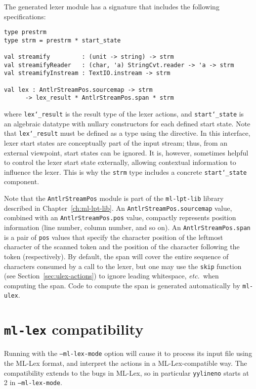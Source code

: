 The generated lexer module has a signature that includes the following specifications:
\begin{lstlisting}
type prestrm
type strm = prestrm * start_state
    
val streamify         : (unit -> string) -> strm
val streamifyReader   : (char, 'a) StringCvt.reader -> 'a -> strm
val streamifyInstream : TextIO.instream -> strm
    
val lex : AntlrStreamPos.sourcemap -> strm
      -> lex_result * AntlrStreamPos.span * strm
\end{lstlisting}%
where \texttt{lex\char`\_result} is the result type of the lexer actions, and \texttt{start\char`\_state} is an algebraic datatype with nullary constructors for each defined start state.
Note that \texttt{lex\char`\_result} must be defined as a type using the  directive.
In this interface, lexer start states are conceptually part of the input stream; thus, from an external viewpoint,
start states can be ignored.
It is, however, sometimes helpful to control the lexer start state externally, allowing contextual
information to influence the lexer.
This is why the \texttt{strm} type includes a concrete \texttt{start\char`\_state} component.

Note that the \texttt{AntlrStreamPos} module is part of the \texttt{ml-lpt-lib} library described in Chapter~\ref{ch:ml-lpt-lib}. 
An \texttt{AntlrStreamPos.sourcemap} value, combined with an \texttt{AntlrStreamPos.pos} value, compactly represents position information (line number, column number, and so on).
An \texttt{AntlrStreamPos.span} is a pair of \texttt{pos} values that specify the character position of the
leftmost character of the scanned token and the position of the character following the token (respectively).
By default, the span will cover the entire sequence of characters consumed by a call to the lexer, but one may
use the \texttt{skip} function (see Section~\ref{sec:ulex-actions}) to ignore leading whitespace, \textit{etc.}\ when computing
the span.
Code to compute the span is generated automatically by \texttt{ml-ulex}.

\section{\texttt{ml-lex} compatibility}\label{sec:lex-compat}

Running \ulex{} with the \texttt{--ml-lex-mode} option will cause it to process its input file using the ML-Lex format, and interpret the actions in a ML-Lex-compatible way.  The compatibility extends to the bugs in ML-Lex, so in particular \texttt{yylineno} starts at 2 in \texttt{--ml-lex-mode}.
